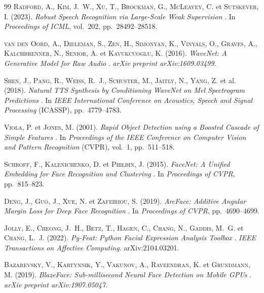 \begin{thebibliography}{99}
\textsc{Radford}, A., \textsc{Kim}, J.~W., \textsc{Xu}, T., \textsc{Brockman}, G.,
\textsc{McLeavey}, C. et \textsc{Sutskever}, I.
(2023).
\og \textit{Robust Speech Recognition via Large-Scale Weak Supervision} \fg{}.
In \textit{Proceedings of ICML}, vol.~202, pp.~28492--28518.

\textsc{van den Oord}, A., \textsc{Dieleman}, S., \textsc{Zen}, H., \textsc{Simonyan}, K.,
\textsc{Vinyals}, O., \textsc{Graves}, A., \textsc{Kalchbrenner}, N., \textsc{Senior}, A.
et \textsc{Kavukcuoglu}, K.
(2016).
\og \textit{WaveNet: A Generative Model for Raw Audio} \fg{}.
\textit{arXiv preprint arXiv:1609.03499}.

\textsc{Shen}, J., \textsc{Pang}, R., \textsc{Weiss}, R.~J., \textsc{Schuster}, M.,
\textsc{Jaitly}, N., \textsc{Yang}, Z. et al.
(2018).
\og \textit{Natural TTS Synthesis by Conditioning WaveNet on Mel Spectrogram Predictions} \fg{}.
In \textit{IEEE International Conference on Acoustics, Speech and Signal Processing} (ICASSP),
pp.~4779--4783.

\textsc{Viola}, P. et \textsc{Jones}, M.
(2001).
\og \textit{Rapid Object Detection using a Boosted Cascade of Simple Features} \fg{}.
In \textit{Proceedings of the IEEE Conference on Computer Vision and Pattern Recognition} (CVPR),
vol.~1, pp.~511--518.

\textsc{Schroff}, F., \textsc{Kalenichenko}, D. et \textsc{Philbin}, J.
(2015).
\og \textit{FaceNet: A Unified Embedding for Face Recognition and Clustering} \fg{}.
In \textit{Proceedings of CVPR}, pp.~815--823.

\textsc{Deng}, J., \textsc{Guo}, J., \textsc{Xue}, N. et \textsc{Zafeiriou}, S.
(2019).
\og \textit{ArcFace: Additive Angular Margin Loss for Deep Face Recognition} \fg{}.
In \textit{Proceedings of CVPR}, pp.~4690--4699.

\textsc{Jolly}, E., \textsc{Cheong}, J.~H., \textsc{Betz}, T., \textsc{Hagen}, C.,
\textsc{Chang}, N., \textsc{Gaddis}, M.~G. et \textsc{Chang}, L.~J.
(2022).
\og \textit{Py-Feat: Python Facial Expression Analysis Toolbox} \fg{}.
\textit{IEEE Transactions on Affective Computing}. arXiv:2104.03201.

\textsc{Bazarevsky}, V., \textsc{Kartynnik}, Y., \textsc{Vakunov}, A.,
\textsc{Raveendran}, K. et \textsc{Grundmann}, M.
(2019).
\og \textit{BlazeFace: Sub-millisecond Neural Face Detection on Mobile GPUs} \fg{}.
\textit{arXiv preprint arXiv:1907.05047}.


\end{thebibliography}
